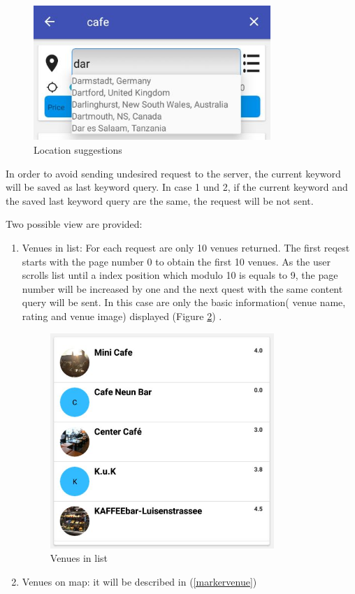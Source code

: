 \begin{figure}[htbp]
	\includegraphics[width=0.8\textwidth]{images/suggestedlocations.jpg}
	\centering
	\caption[]{Location suggestions}
	\label{fig:locationSuggestions}
\end{figure} 
In order to avoid sending undesired request to the server, the current keyword will be saved as last keyword query. In case 1 und 2, if the current keyword and the saved last keyword query are the same, the request will be not sent. 

Two possible view are provided:
 \begin{enumerate}
 	\item Venues in list: For each request are only 10 venues returned. The first reqest starts with the page number 0 to obtain the first 10 venues. As the user scrolls list until a index position which modulo 10 is equals to 9, the page number will be increased by one and the next quest with the same content query will be sent. In this case are only the basic information( venue name, rating and venue image) displayed (Figure \ref{fig:venuesInlist}) .
 	\begin{figure}[htbp]
 		\includegraphics[width=0.8\textwidth]{images/venuesonlist.jpg}
 		\centering
 		\caption[]{Venues in list}
 		\label{fig:venuesInlist}
 	\end{figure}
 	\item Venues on map: it will be described in (\ref{markervenue})
 \end{enumerate}
 
